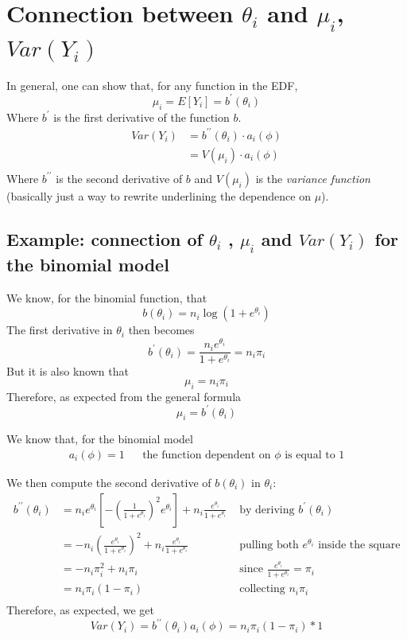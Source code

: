   \section{Connection between \texorpdfstring{$\theta_i$}{thetai} and
    \texorpdfstring{$\mu_i$}{mui}, \texorpdfstring{$Var(Y_i)$}{varyi}} In
    general, one can show that, for any function in the EDF,
    $$\mu_i = E[Y_i] = b^\prime(\theta_i)$$ Where $b^\prime$ is the first
    derivative of the function $b$.
    \begin{align*}
    Var(Y_i) &= b^{\prime\prime}(\theta_i) \cdot a_i(\phi) \\
             &= V(\mu_i) \cdot a_i(\phi)\\
    \end{align*}
    Where $b^{\prime\prime}$ is the second derivative of $b$ and $V(\mu_i)$ is
    the \textit{variance function} (basically just a way to rewrite underlining
    the dependence on $\mu$).

    \subsection{Example: connection of \texorpdfstring{$\theta_i$}{thetai} ,
      \texorpdfstring{$\mu_i$ }{mui} and \texorpdfstring{$Var(Y_i)$}{vari} for
      the binomial model} We know, for the binomial function, that
      $$b(\theta_i) = n_i\log(1+e^{\theta_i})$$ The first derivative in
      $\theta_i$ then becomes
      $$b^\prime(\theta_i) = \frac{n_ie^{\theta_i}}{1+e^{\theta_i}} = n_i\pi_i$$
      But it is also known that
      $$\mu_i = n_i\pi_i$$ Therefore, as expected from the general formula
      $$\mu_i = b^\prime(\theta_i)$$
      
      We know that, for the binomial model
      \begin{align*}
        a_i(\phi) = 1 && \text{the function dependent on } \phi \text{ is equal to } 1   
      \end{align*}
      
      We then compute the second derivative of $b(\theta_i)$ in $\theta_i$:
      \begin{align*}
      b^{\prime\prime}(\theta_i) 
        &= n_ie^{\theta_i}\left[-\left(\frac{1}{1+e^{\theta_i}}\right)^2e^{\theta_i}\right] + n_i\frac{e^{\theta_i}}{1+e^{\theta_i}}
        & \text{ by deriving } b^\prime(\theta_i)\\
        &= -n_i\left(\frac{e^{\theta_i}}{1+e^{\theta_i}}\right)^2 + n_i\frac{e^{\theta_i}}{1+e^{\theta_i}}
        & \text{ pulling both } e^{\theta_i} \text{ inside the square}\\
        &= -n_i\pi_i^2+n_i\pi_i
        & \text{ since } \frac{e^{\theta_i}}{1+e^{\theta_i}} = \pi_i\\
        &= n_i\pi_i(1-\pi_i)
        & \text{ collecting } n_i\pi_i\\
      \end{align*}
      Therefore, as expected, we get
      $$Var(Y_i) = b^{\prime\prime}(\theta_i)a_i(\phi) = n_i\pi_i(1-\pi_i) * 1$$

